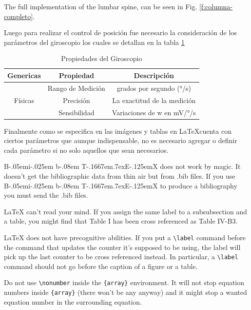 \documentclass[conference]{IEEEtran}
\def\BibTeX{{\rm B\kern-.05em{\sc i\kern-.025em b}\kern-.08em
    T\kern-.1667em\lower.7ex\hbox{E}\kern-.125emX}}
\begin{document}
The full implementation of the lumbar spine, can be seen in Fig. \ref{f:columna-completo}.

Luego para realizar el control de posición fue necesario la consideración de los parámetros del giroscopio los cuales se detallan en la tabla \ref{tabla:gyroscope}

\begin{table}
	\centering
	\caption{Propiedades del Giroscopio}
	\label{tabla:gyroscope}
	\begin{tabular}{|c|c|c|}
		\hline
		Genericas & Propiedad & Descripción \\ \hline
		\multirow{3}{*}{Físicas} & Rango de Medición & grados por segundo (°/s) \\ \cline{2-3}
								 & Precisión & La exactitud de la medición \\ \cline{2-3}
								 & Sensibilidad & Variaciones de w en mV/°/s  \\ \hline
		

	\end{tabular}
\end{table}


Finalmente como se especifica en \cite{perez2024} las imágenes y tablas en \LaTeX cuenta con ciertos parámetros que aunque indispensable, no es necesario agregar o definir cada parámetro si no solo aquellos que sean necesarios.


{\BibTeX} does not work by magic. It doesn't get the bibliographic
data from thin air but from .bib files. If you use {\BibTeX} to produce a
bibliography you must send the .bib files. 

{\LaTeX} can't read your mind. If you assign the same label to a
subsubsection and a table, you might find that Table I has been cross
referenced as Table IV-B3. 

{\LaTeX} does not have precognitive abilities. If you put a
\verb|\label| command before the command that updates the counter it's
supposed to be using, the label will pick up the last counter to be
cross referenced instead. In particular, a \verb|\label| command
should not go before the caption of a figure or a table.

Do not use \verb|\nonumber| inside the \verb|{array}| environment. It
will not stop equation numbers inside \verb|{array}| (there won't be
any anyway) and it might stop a wanted equation number in the
surrounding equation.
\end{document}
